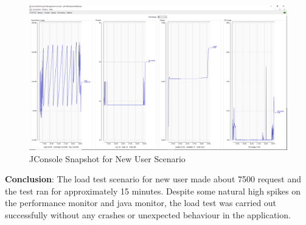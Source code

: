 \documentclass[fontsize=12pt,paper=letter,twoside]{scrartcl}
\begin{document}
\begin{figure}[!htb]
\begin{center}
\includegraphics[width=.7\textwidth]{../../load-test/test-plans/new-user/jconsole-nu.png}
\end{center}
\caption{JConsole Snapshot for New User Scenario}
\label{fig:nuser:jconsole}
\end{figure}

\smallskip
\noindent \textbf{Conclusion}: The load test scenario for new user made about 7500 request and the test ran for approximately 15 minutes. Despite some natural high spikes on the performance monitor and java monitor, the load test was carried out successfully without any crashes or unexpected behaviour in the application.
\end{document}
